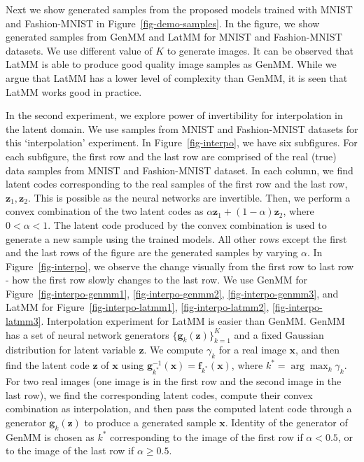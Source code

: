Next we show generated samples from the proposed models trained with MNIST and Fashion-MNIST in Figure~\ref{fig-demo-samples}. In the figure, we show generated samples from GenMM and LatMM for MNIST and Fashion-MNIST datasets. We use different value of $K$ to generate images. It can be observed that LatMM is able to produce good quality image samples as GenMM. While we argue that LatMM has a lower level of complexity than GenMM, it is seen that LatMM works good in practice.    

In the second experiment, we explore power of invertibility for interpolation in the latent domain. We use samples from MNIST and Fashion-MNIST datasets for this `interpolation' experiment. In Figure~\ref{fig-interpo}, we have six subfigures. For each subfigure, the first row and the last row are comprised of the real (true) data samples from MNIST and Fashion-MNIST dataset. In each column, we find latent codes corresponding to the real samples of the first row and the last row, $\bm{z}_1, \bm{z}_2$. This is possible as the neural networks are invertible. Then, we perform a convex combination of the two latent codes as $\alpha \bm{z}_1 + (1- \alpha)\bm{z}_2$, where $0 < \alpha <1$. The latent code produced by the convex combination is used to generate a new sample using the trained models. All other rows except the first and the last rows of the figure are the generated samples by varying $\alpha$. In Figure~\ref{fig-interpo}, we observe the change visually from the first row to last row - how the first row slowly changes to the last row. We use GenMM for Figure~\ref{fig-interpo-genmm1}, \ref{fig-interpo-genmm2}, \ref{fig-interpo-genmm3}, and LatMM for Figure~\ref{fig-interpo-latmm1}, \ref{fig-interpo-latmm2}, \ref{fig-interpo-latmm3}. Interpolation experiment for LatMM is easier than GenMM. GenMM has a set of neural network generators $\{ \bm{g}_k(\bm{z}) \}_{k=1}^K$ and a fixed Gaussian distribution for latent variable $\bm{z}$. We compute $\gamma_k$ for a real image $\bm{x}$, and then find the latent code $\bm{z}$ of $\bm{x}$ using $\bm{g}_{k^{*}}^{-1}(\bm{x})=\bm{f}_{k^{*}}(\bm{x})$, where $k^{*} = \arg \max_{k} \gamma_k$. For two real images (one image is in the first row and the second image in the last row), we find the corresponding latent codes, compute their convex combination as interpolation, and then pass the computed latent code through a generator $\bm{g}_k(\bm{z})$ to produce a generated sample $\bm{x}$. Identity of the generator of GenMM is chosen as $k^{*}$ corresponding to the image of the first row if $\alpha < 0.5$, or to the image of the last row if $\alpha \geq 0.5$.

